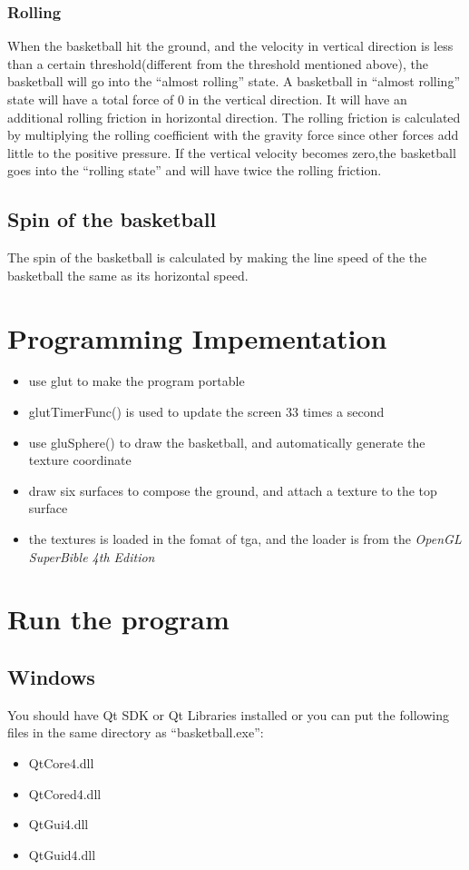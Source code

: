 \documentclass[10pt,a4paper]{article}
\begin{document}
\subsubsection{Rolling}
When the basketball hit the ground, and the velocity in vertical direction is less than a certain threshold(different from the threshold mentioned above), the basketball will go into the ``almost rolling'' state. A basketball in ``almost rolling'' state will have a total force of 0 in the vertical direction. It will have an additional rolling friction in horizontal direction. The rolling friction is calculated by multiplying the rolling coefficient with the gravity force since other forces add little to the positive pressure. If the vertical velocity becomes zero,the basketball goes into the ``rolling state'' and will have twice the rolling friction.

\subsection{Spin of the basketball}
The spin of the basketball is calculated by making the line speed of the the basketball the same as its horizontal speed. 

\section{Programming Impementation}
\begin{itemize}
\item use glut to make the program portable
\item glutTimerFunc() is used to update the screen 33 times a second
\item use gluSphere() to draw the basketball, and automatically generate the texture coordinate
\item draw six surfaces to compose the ground, and attach a texture to the top surface
\item the textures is loaded in the fomat of tga, and the loader is from the \textsl{OpenGL SuperBible 4th Edition}
\end{itemize}

\section{Run the program}
\subsection{Windows}
You should have Qt SDK or Qt Libraries installed or you can put the following files in the same directory as ``basketball.exe'':
\begin{itemize}
\item QtCore4.dll
\item QtCored4.dll
\item QtGui4.dll
\item QtGuid4.dll
\end{itemize}
\end{document}
